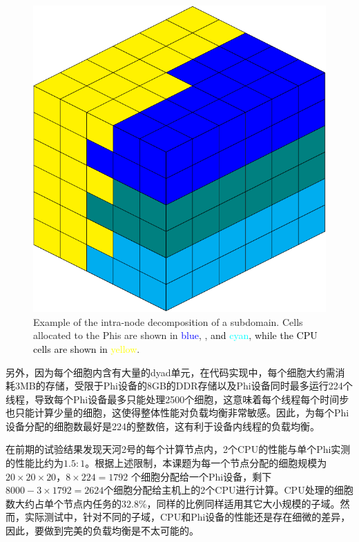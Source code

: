  \begin{figure}[bth]
\center
\includegraphics[scale=0.5]{figs/cube}
\caption{Example of the intra-node decomposition of a subdomain. Cells allocated to the Phis are shown in \textcolor{blue}{blue}, \color{teal}{teal}, \textcolor{black}{and} \textcolor{cyan}{cyan}, \textcolor{black}{while the CPU cells are shown in} \textcolor{yellow}{yellow}.}
\label{nodeload}
\end{figure}

另外，因为每个细胞内含有大量的dyad单元，在代码实现中，每个细胞大约需消耗3MB的存储，受限于Phi设备的8GB的DDR存储以及Phi设备同时最多运行224个线程，导致每个Phi设备最多只能处理2500个细胞，这意味着每个线程每个时间步也只能计算少量的细胞，这使得整体性能对负载均衡非常敏感。因此，为每个Phi设备分配的细胞数最好是224的整数倍，这有利于设备内线程的负载均衡。

在前期的试验结果发现天河2号的每个计算节点内，2个CPU的性能与单个Phi实测的性能比约为$1.5 : 1$。根据上述限制，本课题为每一个节点分配的细胞规模为$20\times20\times20$，$8\times224=1792$ 个细胞分配给一个Phi设备，剩下$8000-3\times1792=2624$个细胞分配给主机上的2个CPU进行计算。CPU处理的细胞数大约占单个节点内任务的$32.8\%$，同样的比例同样适用其它大小规模的子域。然而，实际测试中，针对不同的子域，CPU和Phi设备的性能还是存在细微的差异，因此，要做到完美的负载均衡是不太可能的。

